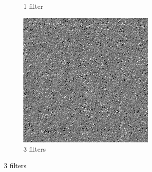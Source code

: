 \documentclass[11pt, oneside]{article}   	%
\begin{document}
\begin{figure}[H]
\begin{subfigure}[b]{0.3\textwidth}
        \caption{1 filter}
        \label{fig:stucco1}
    \end{subfigure}
    \begin{subfigure}[b]{0.3\textwidth}
        \includegraphics[width=\textwidth]{stucco3}
        \caption{3 filters}
        \label{fig:stucco3}
    \end{subfigure}
    

\end{figure}
\end{document}
